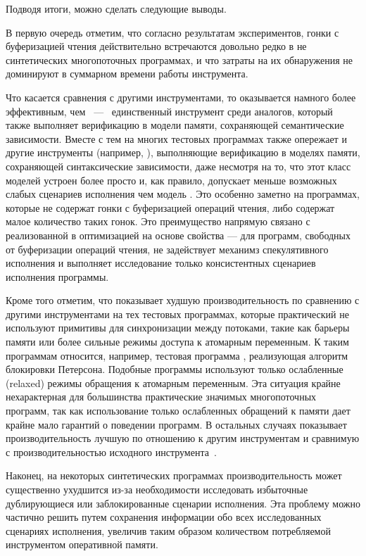 Подводя итоги, можно сделать следующие выводы. 

В первую очередь отметим, что согласно результатам экспериментов,
гонки с буферизацией чтения действительно встречаются 
довольно редко в не синтетических многопоточных программах, 
и что затраты на их обнаружения не доминируют 
в суммарном времени работы инструмента.

Что касается сравнения с другими инструментами, 
то \wmc оказывается намного более эффективным, чем \CDSChecker~---~ 
единственный инструмент среди аналогов, который 
также выполняет верификацию в модели памяти, сохраняющей семантические зависимости.    
Вместе с тем на многих тестовых программах \wmc также опережает 
и другие инструменты (например, \hmc),
выполняющие верификацию в моделях памяти, 
сохраняющей синтаксические зависимости, даже 
несмотря на то, что этот класс моделей устроен более просто
и, как правило, допускает меньше возможных 
слабых сценариев исполнения чем модель \WkmS.
Это особенно заметно на программах, 
которые не содержат гонки с буферизацией операций чтения, 
либо содержат малое количество таких гонок. 
Это преимущество напрямую связано с реализованной в \wmc 
оптимизацией на основе свойства \LBRF --- 
для программ, свободных от буферизации операций чтения, 
\wmc не задействует механимз спекулятивного исполнения 
и выполняет исследование только \RCMM консистентных сценариев исполнения программы.

Кроме того отметим, что \wmc показывает худшую производительность 
по сравнению с другими инструментами на тех тестовых программах, 
которые практический не используют примитивы для синхронизации между потоками, 
такие как барьеры памяти или более сильные режимы доступа к атомарным переменным. 
К таким программам относится, например, тестовая программа , 
реализующая алгоритм блокировки Петерсона. 
Подобные программы используют только ослабленные (relaxed)
режимы обращения к атомарным переменным.
Эта ситуация крайне нехарактерная для большинства 
практические значимых многопоточных программ, 
так как использование только ослабленных обращений к памяти
дает крайне мало гарантий о поведении программ. 
В остальных случаях \wmc показывает производительность 
лучшую по отношению к другим инструментам
и сравнимую с производительностью исходного инструмента~\genmc.

Наконец, на некоторых синтетических программах производительность \wmc 
может существенно ухудшится из-за необходимости исследовать 
избыточные дублирующиеся или заблокированные сценарии исполнения. 
Эта проблему можно частично решить путем сохранения информации
обо всех исследованных сценариях исполнения, увеличив таким образом   
количеством потребляемой инструментом оперативной памяти.
